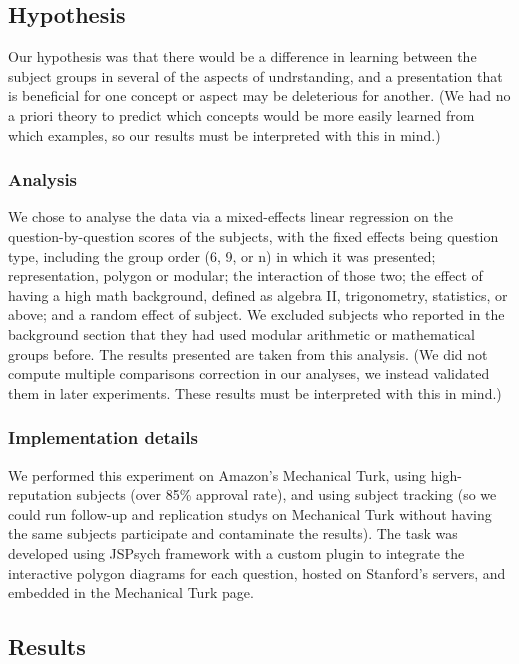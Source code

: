 \documentclass[11pt]{article}
\begin{document}
\subsection{Hypothesis}
Our hypothesis was that there would be a difference in learning between the subject groups in several of the aspects of undrstanding, and a presentation that is beneficial for one concept or aspect may be deleterious for another. (We had no a priori theory to predict which concepts would be more easily learned from which examples, so our results must be interpreted with this in mind.)
\subsubsection{Analysis}
We chose to analyse the data via a mixed-effects linear regression on the question-by-question scores of the subjects, with the fixed effects being question type, including the group order (6, 9, or n) in which it was presented; representation, polygon or modular; the interaction of those two; the effect of having a high math background, defined as algebra II, trigonometry, statistics, or above; and a random effect of subject. We excluded subjects who reported in the background section that they had used modular arithmetic or mathematical groups before. The results presented are taken from this analysis. (We did not compute multiple comparisons correction in our analyses, we instead validated them in later experiments. These results must be interpreted with this in mind.) 
\subsubsection{Implementation details}
We performed this experiment on Amazon's Mechanical Turk, using high-reputation subjects (over 85\% approval rate), and using subject tracking (so we could run follow-up and replication studys on Mechanical Turk without having the same subjects participate and contaminate the results). The task was developed using JSPsych framework with a custom plugin to integrate the interactive polygon diagrams for each question, hosted on Stanford's servers, and embedded in the Mechanical Turk page.  
\subsection{Results} %
\end{document}
